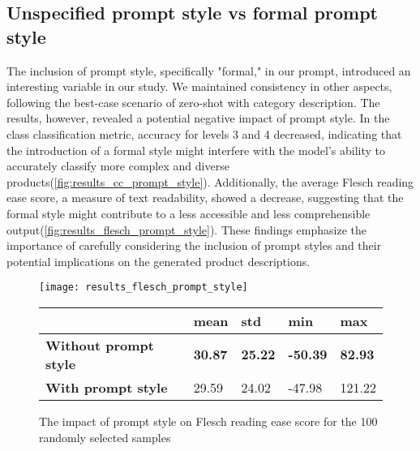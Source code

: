 \subsection{Unspecified prompt style vs formal prompt style}\label{prompt-style}

The inclusion of prompt style, specifically "formal," in our prompt, introduced an interesting variable in our study. We maintained consistency in other aspects, following the best-case scenario of zero-shot with category description. The results, however, revealed a potential negative impact of prompt style. In the class classification metric, accuracy for levels 3 and 4 decreased, indicating that the introduction of a formal style might interfere with the model's ability to accurately classify more complex and diverse products(\autoref{fig:results_cc_prompt_style}). Additionally, the average Flesch reading ease score, a measure of text readability, showed a decrease, suggesting that the formal style might contribute to a less accessible and less comprehensible output(\autoref{fig:results_flesch_prompt_style}). These findings emphasize the importance of carefully considering the inclusion of prompt styles and their potential implications on the generated product descriptions.



\begin{figure}[H]
	\centering
	\texttt{[image: results\_flesch\_prompt\_style]}
	\begin{tabular}{|l|l|l|l|l|}
		\hline
		\textbf{} & \textbf{mean} & \textbf{std} & \textbf{min} & \textbf{max} \\ \hline
		\textbf{Without prompt style} & \textbf{30.87} & \textbf{25.22} & \textbf{-50.39} & \textbf{82.93} \\ \hline
		\textbf{With prompt style } & 29.59  & 24.02  & -47.98  & 121.22 \\ \hline
	\end{tabular}
	\captionsetup{labelformat=andtable}
	\caption{The impact of prompt style on Flesch reading ease score for the 100 randomly selected samples}
	\label{fig:results_flesch_prompt_style}
\end{figure}


